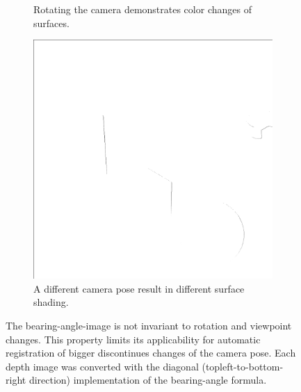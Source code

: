 \begin{figure}[H]
\begin{subfigure}[t]{0.32\textwidth}
        \caption{Rotating the camera demonstrates color changes of surfaces.}
    \end{subfigure}
    \begin{subfigure}[t]{0.32\textwidth}
        \includegraphics[width=\linewidth]{chapter04/img/bearing-diag-0210.png}
        \caption{A different camera pose result in different surface shading.}
    \end{subfigure}
    \caption[Bearing Angle Image Characteristics demonstrated]{The \gls{bearing-angle-image} is not invariant to rotation and viewpoint changes. This property limits its applicability for automatic registration of bigger discontinues changes of the camera pose. Each depth image was converted with the diagonal (topleft-to-bottom-right direction) implementation of the \gls{bearing-angle} formula.}
\end{figure}
